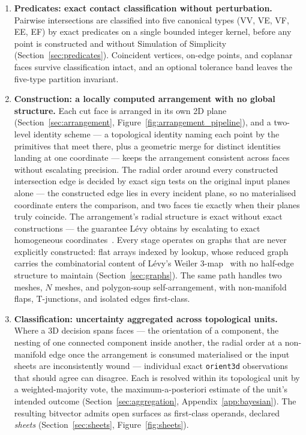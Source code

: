 \documentclass{egpubl}
\begin{document}
\begin{enumerate}
\item \textbf{Predicates: exact contact classification without perturbation.}
Pairwise intersections are classified into five canonical types (VV, VE, VF, EE, EF) by exact predicates on a single bounded integer kernel, before any point is constructed and without Simulation of Simplicity~\cite{EdelsbrunnerMucke1990} (Section~\ref{sec:predicates}). Coincident vertices, on-edge points, and coplanar faces survive classification intact, and an optional tolerance band leaves the five-type partition invariant.

\item \textbf{Construction: a locally computed arrangement with no global structure.}
Each cut face is arranged in its own 2D plane (Section~\ref{sec:arrangement}, Figure~\ref{fig:arrangement_pipeline}), and a two-level identity scheme --- a topological identity naming each point by the primitives that meet there, plus a geometric merge for distinct identities landing at one coordinate --- keeps the arrangement consistent across faces without escalating precision. The radial order around every constructed intersection edge is decided by exact sign tests on the original input planes alone --- the constructed edge lies in every incident plane, so no materialised coordinate enters the comparison, and two faces tie exactly when their planes truly coincide. The arrangement's radial structure is exact without exact constructions --- the guarantee L\'evy obtains by escalating to exact homogeneous coordinates~\cite{Levy2025}. Every stage operates on graphs that are never explicitly constructed: flat arrays indexed by lookup, whose reduced graph carries the combinatorial content of L\'evy's Weiler 3-map~\cite{Weiler1985,Levy2025} with no half-edge structure to maintain (Section~\ref{sec:graphs}). The same path handles two meshes, $N$ meshes, and polygon-soup self-arrangement, with non-manifold flaps, T-junctions, and isolated edges first-class.

\item \textbf{Classification: uncertainty aggregated across topological units.}
Where a 3D decision spans faces --- the orientation of a component, the nesting of one connected component inside another, the radial order at a non-manifold edge once the arrangement is consumed materialised or the input sheets are inconsistently wound --- individual exact \texttt{orient3d} observations that should agree can disagree. Each is resolved within its topological unit by a weighted-majority vote, the maximum-a-posteriori estimate of the unit's intended outcome (Section~\ref{sec:aggregation}, Appendix~\ref{app:bayesian}). The resulting bitvector admits open surfaces as first-class operands, declared \emph{sheets} (Section~\ref{sec:sheets}, Figure~\ref{fig:sheets}).


\end{enumerate}
\end{document}
